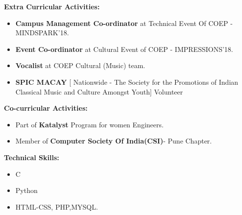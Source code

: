 \documentclass[a4paper,11pt]{article}
\begin{document}
\begin{minipage}[t]{0.5\textwidth}
			\raggedright\smallskip
			\begin{LARGE}
				\Large \textbf{Extra Curricular Activities:}\medskip%
				{\small
					\begin{itemize}
						\item {\textbf{Campus Management Co-ordinator} at Technical Event Of COEP - MINDSPARK'18.}
						\item {\textbf{Event Co-ordinator} at Cultural Event of COEP - IMPRESSIONS'18.}
						\item {\textbf{Vocalist} at COEP Cultural (Music) team.}
						\item {\textbf{SPIC MACAY} [ Nationwide - The Society for the Promotions of Indian Classical Music and Culture Amongst Youth] Volunteer }
					\end{itemize}
				}
			\end{LARGE}
			\vspace{0.5cm}
\begin{LARGE}
			\textbf{Co-curricular Activities:}\medskip%
				{\small
					\begin{itemize}
						\item {Part of \textbf{Katalyst} Program for women Engineers.}
						\item {Member of \textbf{Computer Society Of India(CSI)}- Pune Chapter}.
					\end{itemize}
				}
				
			\end{LARGE}
			\vspace{0.5cm}
\begin{LARGE}
				\Large \textbf{Technical Skills:}\medskip%
				{\small
					\begin{itemize}
						\item {C}
						\item Python
						\item {HTML-CSS, PHP,MYSQL.}
						
					\end{itemize}
				}
			\end{LARGE}
			
			\vspace{0.7cm}
\end{minipage}%
\hspace{0.6cm}
\end{document}
